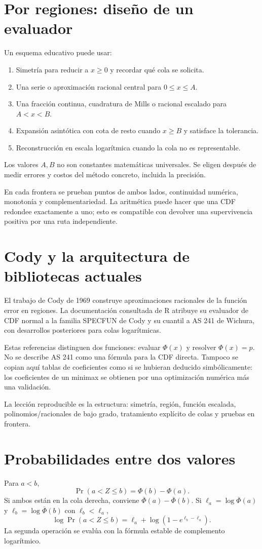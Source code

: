 \documentclass[11pt,a4paper]{article}
\theoremstyle{definition}
\newcommand{\Q}{\overline\Phi}
\begin{document}
\section{Por regiones: diseño de un evaluador}
Un esquema educativo puede usar:
\begin{enumerate}
\item Simetría para reducir a $x\ge0$ y recordar qué cola se solicita.
\item Una serie o aproximación racional central para $0\le x\le A$.
\item Una fracción continua, cuadratura de Mills o racional escalado para $A<x<B$.
\item Expansión asintótica con cota de resto cuando $x\ge B$ y satisface la tolerancia.
\item Reconstrucción en escala logarítmica cuando la cola no es representable.
\end{enumerate}
Los valores $A,B$ no son constantes matemáticas universales. Se eligen después de medir errores y costos del método concreto, incluida la precisión.

En cada frontera se prueban puntos de ambos lados, continuidad numérica, monotonía y complementariedad. La aritmética puede hacer que una CDF redondee exactamente a uno; esto es compatible con devolver una supervivencia positiva por una ruta independiente.

\section{Cody y la arquitectura de bibliotecas actuales}
El trabajo de Cody de 1969 construye aproximaciones racionales de la función error en regiones. La documentación consultada de R atribuye su evaluador de CDF normal a la familia SPECFUN de Cody y su cuantil a AS 241 de Wichura, con desarrollos posteriores para colas logarítmicas.

Estas referencias distinguen dos funciones: evaluar $\Phi(x)$ y resolver $\Phi(x)=p$. No se describe AS 241 como una fórmula para la CDF directa. Tampoco se copian aquí tablas de coeficientes como si se hubieran deducido simbólicamente: los coeficientes de un minimax se obtienen por una optimización numérica más una validación.

La lección reproducible es la estructura: simetría, región, función escalada, polinomios/racionales de bajo grado, tratamiento explícito de colas y pruebas en frontera.

\section{Probabilidades entre dos valores}
Para $a<b$,
\[
\Pr(a<Z\le b)=\Phi(b)-\Phi(a).
\]
Si ambos están en la cola derecha, conviene $\Q(a)-\Q(b)$. Si $\ell_a=\log\Q(a)$ y $\ell_b=\log\Q(b)$ con $\ell_b<\ell_a$,
\[
\log\Pr(a<Z\le b)
=\ell_a+\log(1-e^{\ell_b-\ell_a}).
\]
La segunda operación se evalúa con la fórmula estable de complemento logarítmico.
\end{document}
